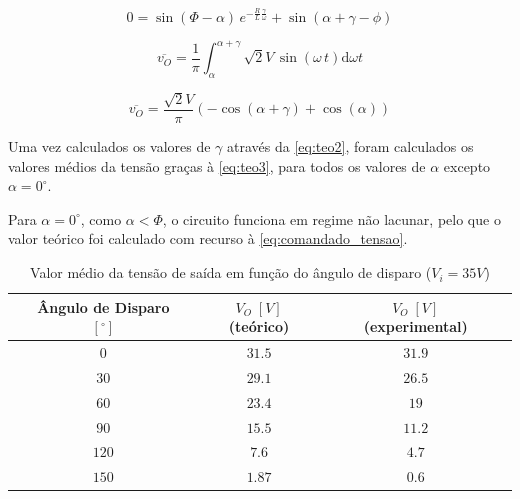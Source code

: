\documentclass[a4paper,11pt]{article}
\numberwithin{equation}{section}
\begin{document}
\begin{equation}
\label{eq:teo2}
0 = \sin{(\Phi - \alpha)}\,e^{-\frac{R}{L}\frac{\gamma}{\omega}}+\sin{(\alpha + \gamma - \phi)}
\end{equation}

\begin{equation}
\label{eq:teo3}
\overline{v_O} = \frac{1}{\pi} \int_\alpha^{\alpha+\gamma} \sqrt{2}V\,\sin{(\omega\,t)} \mathrm{d}\omega t
\end{equation}

\begin{equation}
\label{eq:teo4}
\overline{v_O} = \frac{\sqrt{2}V}{\pi} \left(-\cos{(\alpha + \gamma)}+\cos{(\alpha)}\right)
\end{equation}

Uma vez calculados os valores de $\gamma$ através da \autoref{eq:teo2}, foram calculados os valores médios da tensão graças à \autoref{eq:teo3}, para todos os valores de $\alpha$ excepto $\alpha = 0^\circ$.

Para $\alpha = 0^\circ$, como $\alpha < \Phi$, o circuito funciona em regime não lacunar, pelo que o valor teórico foi calculado com recurso à \autoref{eq:comandado_tensao}.

\begin{table}[H]
\centering
\begin{tabular}{c c c c c c c}
\hfil & Ângulo de Disparo $[^\circ]$ & \hfil & $V_O\;[V]$ (teórico) & \hfil & $V_O\;[V]$ (experimental) & \hfil \\
\hline
			&$0$&	&$31.5$&		&$31.9$&\\
\rowcolor{SkyBlue}	&$30$&	&$29.1$&		&$26.5$&\\
			&$60$&	&$23.4$&		&$19$&\\
\rowcolor{SkyBlue}	&$90$&	&$15.5$&		&$11.2$&\\
			&$120$&	&$7.6$&			&$4.7$&\\
\rowcolor{SkyBlue}	&$150$&	&$1.87$&		&$0.6$&\\
\hline
\end{tabular}
\caption{Valor médio da tensão de saída em função do ângulo de disparo ($V_i = 35 V$)}
\label{tab:akpklac}
\end{table}
\end{document}
